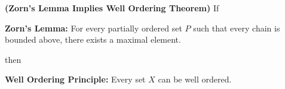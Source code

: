 \documentclass{report}
\begin{document}
\begin{theorem}
\label{0.3.13}
\textbf{(Zorn's Lemma Implies Well Ordering Theorem)}  
If
\begin{center}
    \begin{minipage}{0.9\linewidth}  
        \centering
        \textbf{Zorn's Lemma:} For every partially ordered set $P$ such that every chain is bounded above, there exists a maximal element.
    \end{minipage}
\end{center}
then
\begin{center}
    \begin{minipage}{0.9\linewidth}  
        \centering
       \textbf{Well Ordering Principle:} Every set $X$ can be well ordered.
    \end{minipage}
\end{center}
\end{theorem}
\end{document}
